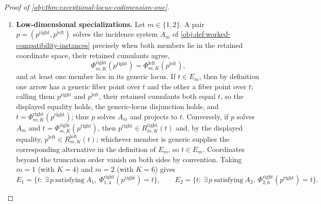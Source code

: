 \begin{proof}[Proof of \cref{obj:thm:exceptional-locus-codimension-one}]
\begin{enumerate}
\item \textbf{Low-dimensional specializations.}  Let \(m\in\{1,2\}\).  A pair \(p=(p^{\mathrm{right}},p^{\mathrm{left}})\) solves the incidence system \(A_m\) of \cref{obj:def:worked-compatibility-instances} precisely when both members lie in the retained coordinate space, their retained cumulants agree,
\[
\Phi^{\mathrm{right}}_{m,K}(p^{\mathrm{right}})=\Phi^{\mathrm{left}}_{m,K}(p^{\mathrm{left}}),
\]
and at least one member lies in its generic locus.  If \(t\in E_m\), then by definition one arrow has a generic fiber point over \(t\) and the other a fiber point over \(t\); calling them \(p^{\mathrm{right}}\) and \(p^{\mathrm{left}}\), their retained cumulants both equal \(t\), so the displayed equality holds, the generic-locus disjunction holds, and \(t=\Phi^{\mathrm{right}}_{m,K}(p^{\mathrm{right}})\); thus \(p\) solves \(A_m\) and projects to \(t\).  Conversely, if \(p\) solves \(A_m\) and \(t=\Phi^{\mathrm{right}}_{m,K}(p^{\mathrm{right}})\), then \(p^{\mathrm{right}}\in R^{\mathrm{right}}_{m,K}(t)\) and, by the displayed equality, \(p^{\mathrm{left}}\in R^{\mathrm{left}}_{m,K}(t)\); whichever member is generic supplies the corresponding alternative in the definition of \(E_m\), so \(t\in E_m\).  Coordinates beyond the truncation order vanish on both sides by convention.  Taking \(m=1\) (with \(K=4\)) and \(m=2\) (with \(K=6\)) gives
\[
E_1=\bigl\{t:\ \exists\,p\ \text{satisfying}\ A_1,\ \Phi^{\mathrm{right}}_{1,4}(p^{\mathrm{right}})=t\bigr\},
\qquad
E_2=\bigl\{t:\ \exists\,p\ \text{satisfying}\ A_2,\ \Phi^{\mathrm{right}}_{2,6}(p^{\mathrm{right}})=t\bigr\}.
\]
\end{enumerate}
\end{proof}

